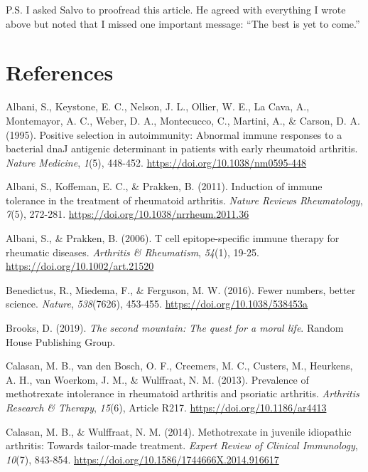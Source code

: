 \documentclass[authordate, editorial, issue]{jote-new-article}
\begin{document}
	P.S. I asked Salvo to proofread this article. He agreed with everything I wrote above but noted that I missed one important message: “The best is yet to come.”



	\section{References}



	Albani, S., Keystone, E. C., Nelson, J. L., Ollier, W. E., La Cava, A., Montemayor, A. C., Weber, D. A., Montecucco, C., Martini, A., \& Carson, D. A. (1995). Positive selection in autoimmunity: Abnormal immune responses to a bacterial dnaJ antigenic determinant in patients with early rheumatoid arthritis. \emph{Nature Medicine},\emph{ 1}(5), 448-452. \url{https://doi.org/10.1038/nm0595-448}



	Albani, S., Koffeman, E. C., \& Prakken, B. (2011). Induction of immune tolerance in the treatment of rheumatoid arthritis. \emph{Nature Reviews Rheumatology},\emph{ 7}(5), 272-281. \url{https://doi.org/10.1038/nrrheum.2011.36}



	Albani, S., \& Prakken, B. (2006). T cell epitope-specific immune therapy for rheumatic diseases. \emph{Arthritis \& Rheumatism},\emph{ 54}(1), 19-25. \url{https://doi.org/10.1002/art.21520}



	Benedictus, R., Miedema, F., \& Ferguson, M. W. (2016). Fewer numbers, better science. \emph{Nature},\emph{ 538}(7626), 453-455. \url{https://doi.org/10.1038/538453a}



	Brooks, D. (2019). \emph{The second mountain: The quest for a moral life}. Random House Publishing Group.



	Calasan, M. B., van den Bosch, O. F., Creemers, M. C., Custers, M., Heurkens, A. H., van Woerkom, J. M., \& Wulffraat, N. M. (2013). Prevalence of methotrexate intolerance in rheumatoid arthritis and psoriatic arthritis. \emph{Arthritis Research \& Therapy},\emph{ 15}(6), Article R217. \url{https://doi.org/10.1186/ar4413}



	Calasan, M. B., \& Wulffraat, N. M. (2014). Methotrexate in juvenile idiopathic arthritis: Towards tailor-made treatment. \emph{Expert Review of Clinical Immunology},\emph{ 10}(7), 843-854. \url{https://doi.org/10.1586/1744666X.2014.916617}
\end{document}
